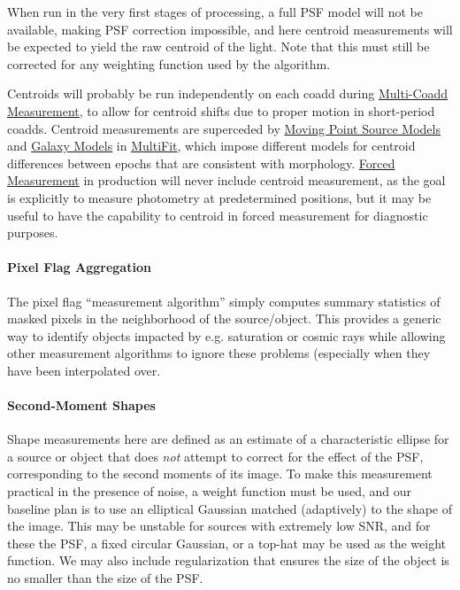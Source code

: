 When run in the very first stages of processing, a full PSF model will not be available, making PSF correction impossible, and here centroid measurements will be expected to yield the raw centroid of the light.  Note that this must still be corrected for any weighting function used by the algorithm.

Centroids will probably be run independently on each coadd during \hyperref[sec:acMultiCoaddMeasurement]{Multi-Coadd Measurement}, to allow for centroid shifts due to proper motion in short-period coadds.  Centroid measurements are superceded by \hyperref[sec:acMovingPointSourceModels]{Moving Point Source Models} and \hyperref[sec:acGalaxyModels]{Galaxy Models} in \hyperref[drpMultiFit]{MultiFit}, which impose different models for centroid differences between epochs that are consistent with morphology.  \hyperref[sec:ForcedMeasurement]{Forced Measurement} in production will never include centroid measurement, as the goal is explicitly to measure photometry at predetermined positions, but it may be useful to have the capability to centroid in forced measurement for diagnostic purposes.

\paragraph{Pixel Flag Aggregation}
\label{sec:acPixelFlags}

The pixel flag ``measurement algorithm'' simply computes summary statistics of masked pixels in the neighborhood of the source/object.  This provides a generic way to identify objects impacted by e.g. saturation or cosmic rays while allowing other measurement algorithms to ignore these problems (especially when they have been interpolated over.

\paragraph{Second-Moment Shapes}
\label{sec:acShapeAlgorithms}

Shape measurements here are defined as an estimate of a characteristic ellipse for a source or object that does \emph{not} attempt to correct for the effect of the PSF, corresponding to the second moments of its image.  To make this measurement practical in the presence of noise, a weight function must be used, and our baseline plan is to use an elliptical Gaussian matched (adaptively) to the shape of the image.  This may be unstable for sources with extremely low SNR, and for these the PSF, a fixed circular Gaussian, or a top-hat may be used as the weight function.  We may also include regularization that ensures the size of the object is no smaller than the size of the PSF.


